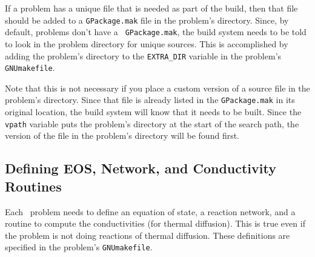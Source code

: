 If a problem has a unique file that is needed as part of the build,
then that file should be added to a {\tt GPackage.mak} file in the
problem's directory.  Since, by default, problems don't have a {\tt
GPackage.mak}, the build system needs to be told to look in the
problem directory for unique sources.  This is accomplished by adding
the problem's directory to the {\tt EXTRA\_DIR} variable in the
problem's {\tt GNUmakefile}.  

Note that this is not necessary if you place a custom version of 
a source file in the problem's directory.  Since that file is already
listed in the {\tt GPackage.mak} in its original location, the build
system will know that it needs to be built.  Since the {\tt vpath}
variable puts the problem's directory at the start of the search
path, the version of the file in the problem's directory will be 
found first.

\subsection{Defining EOS, Network, and Conductivity Routines}

Each \maestro\ problem needs to define an equation of state, a
reaction network, and a routine to compute the conductivities (for
thermal diffusion).  This is true even if the problem is not doing
reactions of thermal diffusion.  These definitions are specified
in the problem's {\tt GNUmakefile}.

